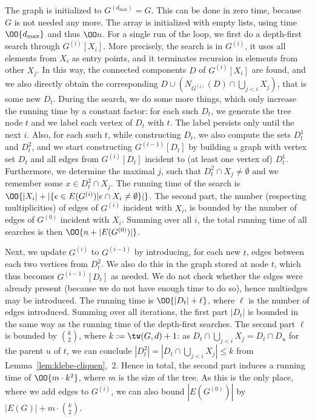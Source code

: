 \documentclass{LMCS}
\begin{document}
\noindent The graph is initialized to $G^{(d_{\max})}=G$. 
This can be done in zero time, because $G$ is not needed any more. 
The array is initialized with empty lists, 
using time $\OO{d_{\max}}$ and thus $\OO n$. 
For a single run of the loop, 
we first do a depth-first search through $G^{(i)}[X_i]$. 
More precisely, the search is in $G^{(i)}$, 
it uses all elements from $X_i$ as entry points, 
and it terminates recursion in elements from other $X_j$. 
In this way, the connected components $D$ of $G^{(i)}[X_i]$ are found, 
and we also directly obtain 
the corresponding $D\cup (N_{G^{(i)}}(D) \cap \bigcup\limits_{j<i}X_j)$, 
that is some new $D_t$. 
During the search, we do some more things, 
which only increase the running time by a constant factor: 
for each such $D_t$, we generate the tree node $t$ 
and we label each vertex of $D_t$ with $t$. 
The label persists only until the next $i$. 
Also, for each such $t$, while constructing $D_t$, 
we also compute the sets $D^1_t$ and $D^2_t$, 
and we start constructing $G^{(i-1)}[D_t]$ 
by building a graph with vertex set $D_t$ 
and all edges from $G^{(i)}[D_t]$ incident to (at least one vertex of) $D^1_t$. 
Furthermore, 
we determine the maximal $j$, such that $D_t^2\cap X_j\not=\emptyset$ 
and we remember some $x\in D_t^2\cap X_j$. 
The running time of the search 
is $\OO{|X_i|+|\{e\in E(G^{(i)}) | e\cap X_i\not=\emptyset\}|}$. 
The second part, the number (respecting multiplicities) 
of edges of $G^{(i)}$ incident with $X_i$, 
is bounded by the number of edges of $G^{(0)}$ incident with $X_i$. 
Summing over all $i$, the total running time of all searches 
is then $\OO{n+|E(G^{(0)})|}$. 

Next, we update $G^{(i)}$ to $G^{(i-1)}$ 
by introducing, for each new $t$, 
edges between each two vertices from $D^2_t$. 
We also do this in the graph stored at node $t$, 
which thus becomes $G^{(i-1)}[D_t]$ as needed. 
We do not check whether the edges were already present 
(because we do not have enough time to do so), 
hence multiedges may be introduced. 
The running time is $\OO{|D_t|+\ell}$, 
where $\ell$ is the number of edges introduced. 
Summing over all iterations, 
the first part $|D_t|$ is bounded in the same way 
as the running time of the depth-first searches. 
The second part $\ell$ is bounded by $\binom k2$, where $k:=\tw(G,d)+1$: 
as $D_t\cap\bigcup\limits_{j<i}X_j=D_t\cap D_u$ for the parent $u$ of $t$, 
we can conclude $|D^2_t|=|D_t\cap\bigcup\limits_{j<i}X_j|\leq k$ 
from Lemma~\ref{lem:klebe-cliquen},~2. 
Hence in total, the second part induces a running time of $\OO{m\cdot k^2}$, 
where $m$ is the size of the tree. 
As this is the only place, where we add edges to $G^{(i)}$, 
we can also bound $|E(G^{(0)})|$ by $|E(G)|+m\cdot\binom k2$. 
\end{document}
